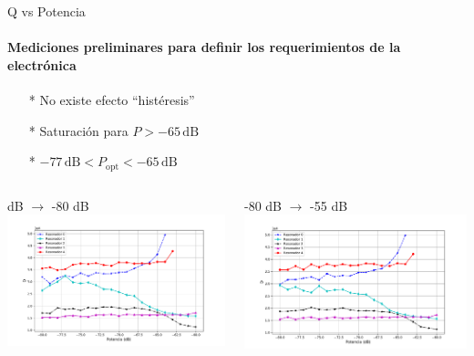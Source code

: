 \documentclass[ignorenonframetext,12pt]{beamer}
\begin{document}
%
\begin{frame}{Q vs Potencia}
				\framesubtitle{Mediciones preliminares para definir los requerimientos
				de la electrónica}
				\footnotesize{\begin{itemize}
								\item[*] No existe efecto ``histéresis'' 
								\item[*] Saturación para $P > -65\,\text{dB}$
								\item[*] \alert{$-77\,\text{dB} < P_\text{opt} <
												-65\,\text{dB}$}

				\end{itemize}}
				\begin{columns}
								\begin{column}{0.49\textwidth}
												\qquad {} dB $\to$ -80 dB
												\centering
												\includegraphics[height=0.45\textheight,width=1.1\textwidth]{Q_vs_P_tot_des}
								\end{column}
								\begin{column}{0.49\textwidth}
												-80 dB $\to$ -55 dB
												\centering
												\includegraphics[height=0.45\textheight,width=1.1\textwidth]{Q_vs_P_tot_asc}
								\end{column}
				\end{columns}

\end{frame}
\end{document}

